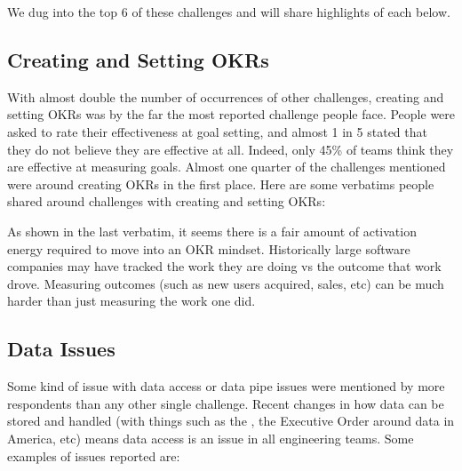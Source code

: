 \documentclass[sigconf, nonacm]{acmart}
\begin{document}
We dug into the top 6 of these challenges and will share highlights of each below.

\subsection{Creating and Setting OKRs}
With almost double the number of occurrences of other challenges, creating and setting OKRs was by the far the most reported challenge people face. People were asked to rate their effectiveness at goal setting, and almost 1 in 5 stated that they do not believe they are effective at all. Indeed, only 45\% of teams think they are effective at measuring goals. Almost one quarter of the challenges mentioned were around creating OKRs in the first place. Here are some verbatims people shared around challenges with creating and setting OKRs:
\newline





As shown in the last verbatim, it seems there is a fair amount of activation energy required to move into an OKR mindset. Historically large software companies may have tracked the work they are doing vs the outcome that work drove. Measuring outcomes (such as new users acquired, sales, etc) can be much harder than just measuring the work one did.


\subsection{Data Issues}

Some kind of issue with data access or data pipe issues were mentioned by more respondents than any other single challenge. Recent changes in how data can be stored and handled (with things such as the , the Executive Order around data in America, etc) means data access is an issue in all engineering teams. Some examples of issues reported are:
\end{document}
